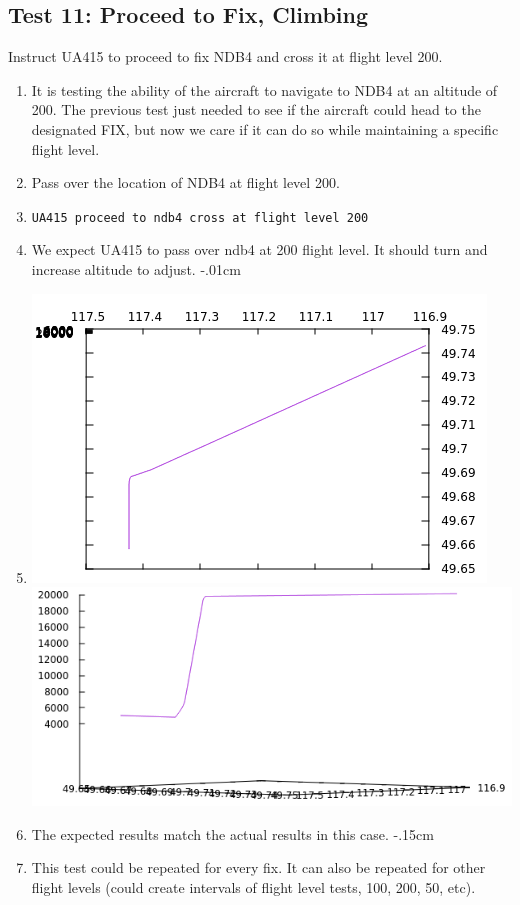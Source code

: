 \documentclass[letterpaper, 12pt]{article}
\begin{document}
\subsection{Test 11: Proceed to Fix, Climbing}
Instruct UA415 to proceed to fix NDB4 and cross it at flight level 200.
\begin{enumerate}\itemsep-.15cm
\item It is testing the ability of the aircraft to navigate to NDB4 at an altitude of 200. The previous test just needed to see if the aircraft could head to the designated FIX, but now we care if it can do so while maintaining a specific flight level.
\item Pass over the location of NDB4 at flight level 200.
\item \verb!UA415 proceed to ndb4 cross at flight level 200!
\item We expect UA415 to pass over ndb4 at 200 flight level. It should turn and increase altitude to adjust.
\itemsep-.01cm
\item \includegraphics[scale=.6,valign=t]{test11_1.png} \includegraphics[scale=.5,valign=t]{test11_2.png}
\item The expected results match the actual results in this case.
\itemsep-.15cm
\item This test could be repeated for every fix. It can also be repeated for other flight levels (could create intervals of flight level tests, 100, 200, 50, etc).
\end{enumerate}
\end{document}
